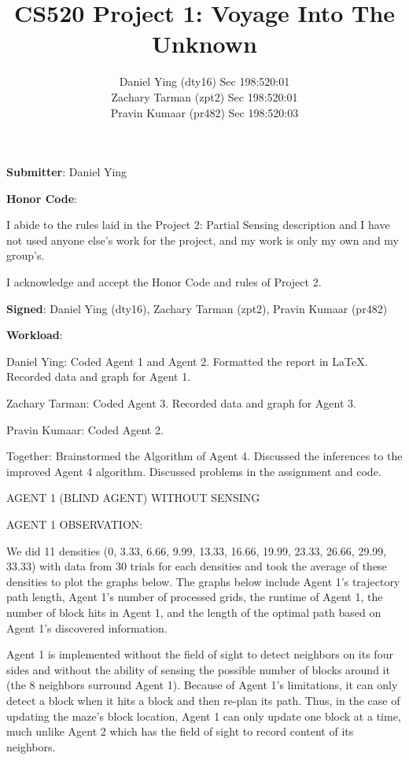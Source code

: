 \documentclass{homeworg}
\title{CS520 Project 1: Voyage Into The Unknown}
\author{Daniel Ying (dty16) Sec 198:520:01 \\Zachary Tarman (zpt2) Sec 198:520:01 \\ Pravin Kumaar (pr482) Sec 198:520:03 }
\begin{document}
\maketitle

\textbf{Submitter}: Daniel Ying

\textbf{Honor Code}:

I abide to the rules laid in the Project 2: Partial Sensing description and I have not used anyone else’s work for the project, and my work is only my own and my group’s.

\hrulefill

I acknowledge and accept the Honor Code and rules of Project 2.

\textbf{Signed}: Daniel Ying (dty16), Zachary Tarman (zpt2), Pravin Kumaar (pr482)

\hrulefill

\textbf{Workload}: 

Daniel Ying: Coded Agent 1 and Agent 2. Formatted the report in LaTeX. Recorded data and graph for Agent 1.

Zachary Tarman: Coded Agent 3. Recorded data and graph for Agent 3.

Pravin Kumaar: Coded Agent 2.

Together: Brainstormed the Algorithm of Agent 4. Discussed the inferences to the improved Agent 4 algorithm. Discussed problems in the assignment and code.
\vspace{.5cm}

\newpage
\exercise
AGENT 1 (BLIND AGENT) WITHOUT SENSING

AGENT 1 OBSERVATION:

We did 11 densities (0, 3.33, 6.66, 9.99, 13.33, 16.66, 19.99, 23.33, 26.66, 29.99, 33.33) with data from 30 trials for each densities and took the average of these densities to plot the graphs below. The graphs below include Agent 1's trajectory path length, Agent 1's number of processed grids, the runtime of Agent 1, the number of block hits in Agent 1, and the length of the optimal path based on Agent 1's discovered information.

Agent 1 is implemented without the field of sight to detect neighbors on its four sides and without the ability of sensing the possible number of blocks around it (the 8 neighbors surround Agent 1). Because of Agent 1's limitations, it can only detect a block when it hits a block and then re-plan its path. Thus, in the case of updating the maze's block location, Agent 1 can only update one block at a time, much unlike Agent 2 which has the field of sight to record content of its neighbors.
\end{document}

